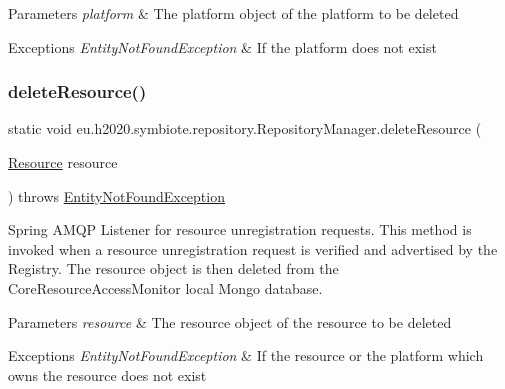 \begin{DoxyParams}{Parameters}
{\em platform} & The platform object of the platform to be deleted \\
\hline
\end{DoxyParams}

\begin{DoxyExceptions}{Exceptions}
{\em Entity\+Not\+Found\+Exception} & If the platform does not exist \\
\hline
\end{DoxyExceptions}
\mbox{\label{classeu_1_1h2020_1_1symbiote_1_1repository_1_1RepositoryManager_aa943334bc33d9e5b9a81978558caba89}} 
\subsubsection{\texorpdfstring{delete\+Resource()}{deleteResource()}}
{\footnotesize\ttfamily static void eu.\+h2020.\+symbiote.\+repository.\+Repository\+Manager.\+delete\+Resource (\begin{DoxyParamCaption}\item[{\hyperlink{classeu_1_1h2020_1_1symbiote_1_1model_1_1Resource}{Resource}}]{resource }\end{DoxyParamCaption}) throws \hyperlink{classeu_1_1h2020_1_1symbiote_1_1exception_1_1EntityNotFoundException}{Entity\+Not\+Found\+Exception}\hspace{0.3cm}{\ttfamily [static]}}

Spring A\+M\+QP Listener for resource unregistration requests. This method is invoked when a resource unregistration request is verified and advertised by the Registry. The resource object is then deleted from the Core\+Resource\+Access\+Monitor local Mongo database.


\begin{DoxyParams}{Parameters}
{\em resource} & The resource object of the resource to be deleted \\
\hline
\end{DoxyParams}

\begin{DoxyExceptions}{Exceptions}
{\em Entity\+Not\+Found\+Exception} & If the resource or the platform which owns the resource does not exist \\
\hline
\end{DoxyExceptions}
\mbox{\label{classeu_1_1h2020_1_1symbiote_1_1repository_1_1RepositoryManager_a496929533495f38ece4f1c5c8bee4bb4}} 
